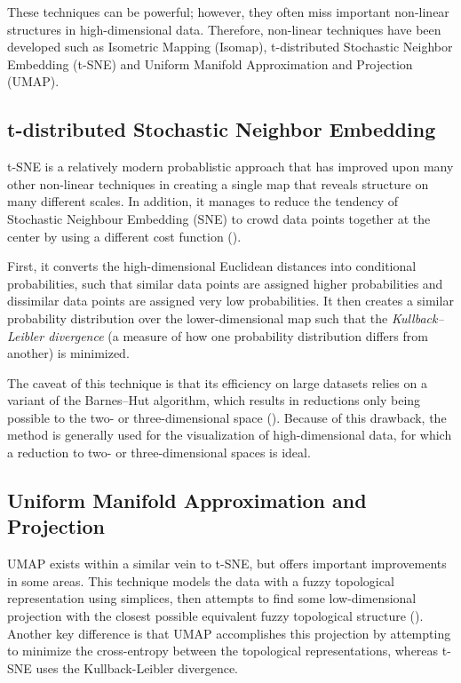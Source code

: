 \documentclass[english,bachelor,ul]{webisthesis} %
\begin{document}
These techniques can be powerful; however, they often miss important non-linear structures in high-dimensional data. Therefore, non-linear techniques have been developed such as Isometric Mapping (Isomap), t-distributed Stochastic Neighbor Embedding (t-SNE) and Uniform Manifold Approximation and Projection (UMAP). 

\subsection*{t-distributed Stochastic Neighbor Embedding}

t-SNE is a relatively modern probablistic approach that has improved upon many other non-linear techniques in creating a single map that reveals structure on many different scales. In addition, it manages to reduce the tendency of Stochastic Neighbour Embedding (SNE) to crowd data points together at the center by using a different cost function (\cite{van2008visualizing}). 

First, it converts the high-dimensional Euclidean distances into conditional probabilities, such that similar data points are assigned higher probabilities and dissimilar data points are assigned very low probabilities. It then creates a similar probability distribution over the lower-dimensional map such that the \textit{Kullback--Leibler divergence} (a measure of how one probability distribution differs from another) is minimized. 

The caveat of this technique is that its efficiency on large datasets relies on a variant of the Barnes--Hut algorithm, which results in reductions only being possible to the two- or three-dimensional space (\cite{DBLP:journals/corr/abs-1301-3342}). Because of this drawback, the method is generally used for the visualization of high-dimensional data, for which a reduction to two- or three-dimensional spaces is ideal.

\subsection*{Uniform Manifold Approximation and Projection}

UMAP exists within a similar vein to t-SNE, but offers important improvements in some areas. This technique models the data with a fuzzy topological representation using simplices, then attempts to find some low-dimensional projection with the closest possible equivalent fuzzy topological structure (\cite{DBLP:journals/corr/abs-1802-03426}). Another key difference is that UMAP accomplishes this projection by attempting to minimize the cross-entropy between the topological representations, whereas t-SNE uses the Kullback-Leibler divergence. 
\end{document}
